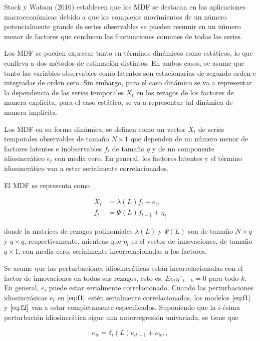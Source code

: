 \documentclass[a4paper,twoside,15pt]{article}
\begin{document}
Stock y Watson (2016) establecen que los MDF se destacan en las aplicaciones macroeconómicas debido a que los complejos movimientos de un número potencialmente grande de series observables se pueden resumir en un número menor de factores que conducen las fluctuaciones comunes de todas las series.

Los MDF se pueden expresar tanto en términos dinámicos como estáticos, lo que conlleva a dos métodos de estimación distintos. En ambos casos, se asume que tanto las variables observables como latentes son estacionarias de segundo orden e integradas de orden cero. Sin embargo, para el caso dinámico se va a representar la dependencia de las series temporales $X_t$ en los rezagos de los factores de manera explícita, para el caso estático, se va a representar tal dinámica de manera implícita.

Los MDF en su forma dinámica, se definen como un vector $X_t$ de series temporales observables de tamaño $N \times 1$ que dependen de un número menor de factores latentes e inobservables $f_t$ de tamaño $q$ y de un componente idiosincrático $e_t$ con media cero. En general, los factores latentes y el término idiosincrático van a estar serialmente correlacionados.


El MDF se representa como 

\begin{align*}
	X_t & = \lambda(L) f_t + e_t, \label{eq:f1} \tag{1} \\
	f_t & = \Psi(L) f_{t-1}+\eta_t \label{eq:f2}\tag{2}
\end{align*}

donde la matrices de rezagos polinomiales $\lambda(L)$ y $\Psi(L)$ son de tamaño $N \times q$ y $q\times q$, respectivamente, mientras que $\eta_t$ es el vector de innovaciones, de tamaño $q\times 1$, con media cero, serialmente incorrelacionadas a los factores.

Se asume que las perturbaciones idiosincráticas están incorrelacionadas con el factor de innovaciones en todos sus rezagos, esto es, $Ee_t \eta´_{t-k}=0$  para todo $k$. En general, $e_t$ puede estar serialmente correlacionado. Cuando las perturbaciones idiosincrásicas $e_t$ en $\eqref{eq:f1}$ estén serialmente correlacionadas, los modelos $\eqref{eq:f1}$ y $\eqref{eq:f2}$ van a estar completamente especificados. Suponiendo que la $i$-ésima perturbación idiosincrática sigue una autorregresión univariada, se tiene que

\begin{equation*}
	e_{it}=\delta_i (L)e_{it-1}+\nu_{it},, \label{eq:f3} \tag{3}
\end{equation*}
\end{document}
